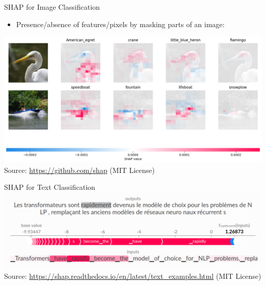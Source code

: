 \documentclass[ignorenonframetext,xcolor=x11names]{beamer}
\begin{document}
\begin{frame}{SHAP for Image Classification}
\begin{itemize}
\item Presence/absence of features/pixels by masking parts of an image:
\end{itemize}

\includegraphics[width=\textwidth]{shap_image.png} \\

\scriptsize Source: \url{https://github.com/shap} (MIT License)
\end{frame}

\begin{frame}{SHAP for Text Classification}
\includegraphics[width=\textwidth]{shap_text.png} \\

\scriptsize Source: \url{https://shap.readthedocs.io/en/latest/text_examples.html} (MIT License)
\end{frame}
\end{document}
